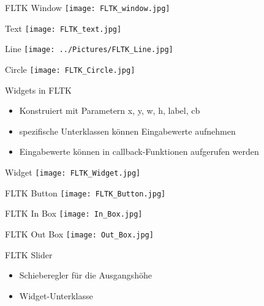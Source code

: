 \documentclass{beamer}
\begin{document}
\begin{frame}{FLTK Window}
\texttt{[image: FLTK\_window.jpg]} 
\end{frame}

\begin{frame}{Text}
\texttt{[image: FLTK\_text.jpg]}  
\end{frame}

\begin{frame}{Line}
\texttt{[image: ../Pictures/FLTK\_Line.jpg]} 
\end{frame}

\begin{frame}{Circle}
\texttt{[image: FLTK\_Circle.jpg]} 
\end{frame}

\begin{frame}{Widgets in FLTK}
\begin{itemize}
\item Konstruiert mit Parametern x, y, w, h, label, cb
\item spezifische Unterklassen können Eingabewerte aufnehmen
\item Eingabewerte können in callback-Funktionen aufgerufen werden
\end{itemize}
\end{frame}

\begin{frame}{Widget}
\texttt{[image: FLTK\_Widget.jpg]} 
\end{frame}

\begin{frame}{FLTK Button}
\texttt{[image: FLTK\_Button.jpg]} 
\end{frame}

\begin{frame}{FLTK In Box}
\texttt{[image: In\_Box.jpg]} 
\end{frame}

\begin{frame}{FLTK Out Box}
\texttt{[image: Out\_Box.jpg]} 
\end{frame}

\begin{frame}{FLTK Slider}
\begin{itemize}
\item Schieberegler für die Ausgangshöhe
\item Widget-Unterklasse
\end{itemize}
\end{frame}
\end{document}

